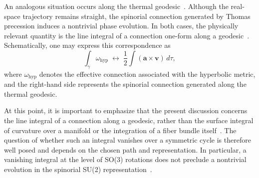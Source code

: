 \documentclass[%
 reprint,
 amsmath,amssymb,
 aps,
 prb,
]{revtex4-2}
\numberwithin{equation}{section}
\begin{document}
An analogous situation occurs along the thermal geodesic~\cite{hanamura17765017}. Although the real-space trajectory remains straight, the spinorial connection generated by Thomas precession induces a nontrivial phase evolution. In both cases, the physically relevant quantity is the line integral of a connection one-form along a geodesic~\cite{nakahara2003,aharonov1959}. Schematically, one may express this correspondence as
\begin{equation}
\int_{\gamma} \omega_{\mathrm{hyp}}
\;\longleftrightarrow\;
\frac{1}{2}\int (\mathbf{a}\times\mathbf{v})\, d\tau ,
\label{eq:correspondence}
\end{equation}
where $\omega_{\mathrm{hyp}}$ denotes the effective connection associated with the hyperbolic metric, and the right-hand side represents the spinorial connection generated along the thermal geodesic.



At this point, it is important to emphasize that the present discussion concerns the line integral of a connection along a geodesic, rather than the surface integral of curvature over a manifold or the integration of a fiber bundle itself~\cite{nakahara2003}. 
The question of whether such an integral vanishes over a symmetric cycle is therefore well posed and depends on the chosen path and representation. 
In particular, a vanishing integral at the level of SO(3) rotations does not preclude a nontrivial evolution in the spinorial SU(2) representation~\cite{wigner1939,sakurai2017}.
\end{document}

